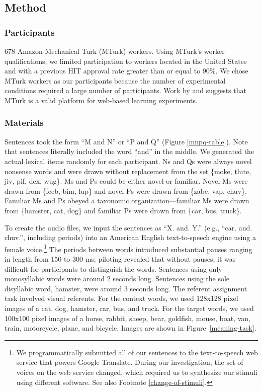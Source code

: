 \documentclass[man,floatsintext]{apa6}
\begin{document}
\subsection{Method}

\subsubsection{Participants}
678 Amazon Mechanical Turk (MTurk) workers. Using MTurk's worker qualifications, we limited participation to workers located in the United States and with a previous HIT approval rate greater than or equal to 90\%. We chose MTurk workers as our participants because the number of experimental conditions required a large number of participants. Work by \citet{buhrmester2010} and \citet{crump2013} suggests that MTurk is a valid platform for web-based learning experiments.

\subsubsection{Materials}
Sentences took the form ``M and N'' or ``P and Q'' (Figure \ref{mnpq-table}). Note that sentences literally included the word ``and'' in the middle. We generated the actual lexical items randomly for each participant. Ns and Qs were always novel nonsense words and were drawn without replacement from the set \{moke, thite, jiv, pif, dex, wug\}. Ms and Ps could be either novel or familiar. Novel Ms were drawn from \{feeb, bim, lup\} and novel Ps were drawn from \{zabe, vap, chuv\}. Familiar Ms and Ps obeyed a taxonomic organization---familiar Ms were drawn from \{hamster, cat, dog\} and familiar Ps were drawn from \{car, bus, truck\}.

To create the audio files, we input the sentences as ``X. and. Y.'' (e.g., ``car. and. chuv.'', including periods) into an American English text-to-speech engine using a female voice.\footnote{\label{tts} We programmatically submitted all of our sentences to the text-to-speech web service that powers Google Translate. During our investigation, the set of voices on the web service changed, which required us to synthesize our stimuli using different software. See also Footnote \ref{change-of-stimuli}.} The periods between words introduced substantial pauses ranging in length from 150 to 300 ms; piloting revealed that without pauses, it was difficult for participants to distinguish the words. Sentences using only monosyllabic words were around 2 seconds long. Sentences using the sole disyllabic word, hamster, were around 3 seconds long.  The referent assignment task involved visual referents. For the context words, we used 128x128 pixel images of a cat, dog, hamster, car, bus, and truck. For the target words, we used 100x100 pixel images of a horse, rabbit, sheep, bear, goldfish, mouse, boat, van, train, motorcycle, plane, and bicycle. Images are shown in Figure~\ref{meaning-task}.
\end{document}
